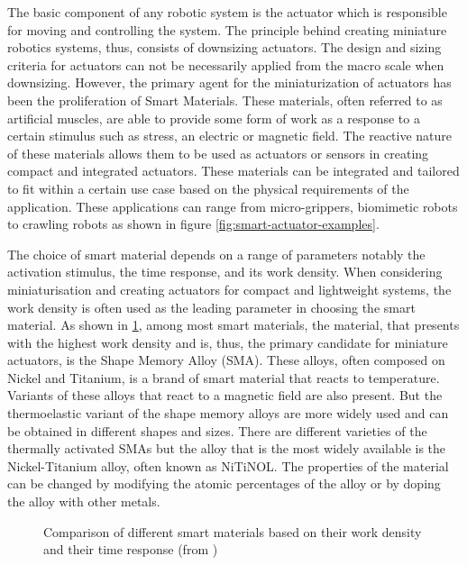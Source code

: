 The basic component of any robotic system is the actuator which is responsible for moving and controlling the system. The principle behind creating miniature robotics systems, thus, consists of downsizing actuators. The design and sizing criteria for actuators can not be necessarily applied from the macro scale when downsizing. However, the primary agent for the miniaturization of actuators has been the proliferation of Smart Materials. These materials, often referred to as artificial muscles, are able to provide some form of work as a response to a certain stimulus such as stress, an electric or magnetic field. The reactive nature of these materials allows them to be used as actuators or sensors in creating compact and integrated actuators. These materials can be integrated and tailored to fit within a certain use case based on the physical requirements of the application. These applications can range from micro-grippers, biomimetic robots to crawling robots as shown in figure \cref{fig:smart-actuator-examples}.

The choice of smart material depends on a range of parameters notably the activation stimulus, the time response, and its work density. When considering miniaturisation and creating actuators for compact and lightweight systems, the work density is often used as the leading parameter in choosing the smart material. As shown in \cref{fig:smart-material-comparison}, among most smart materials, the material, that presents with the highest work density and is, thus, the primary candidate for miniature actuators, is the Shape Memory Alloy (SMA). These alloys, often composed on Nickel and Titanium, is a brand of smart material that reacts to temperature. Variants of these alloys that react to a magnetic field are also present. But the thermoelastic variant of the shape memory alloys are more widely used and can be obtained in different shapes and sizes. There are different varieties of the thermally activated SMAs but the alloy that is the most widely available is the Nickel-Titanium alloy, often known as NiTiNOL. The properties of the material can be changed by modifying the atomic percentages of the alloy or by doping the alloy with other metals.

\begin{figure}[ht] %
  \centering
  \resizebox{0.8\textwidth}{!}{}
  \caption{Comparison of different smart materials based on their work density and their time response (from \cite{preumontMechatronicsDynamicsElectromechanical2006})}
  \label{fig:smart-material-comparison}
\end{figure}

